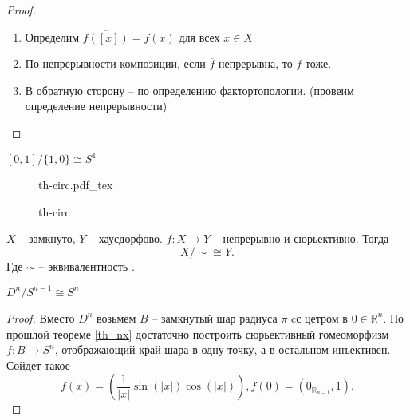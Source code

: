 \documentclass[11pt]{book}
\newcommand{\incfig}[1]{%
    \def\svgwidth{\columnwidth}
    {#1.pdf_tex}
}
\newcommand{\R}{\mathbb{R}}
\theoremstyle{definition}
\theoremstyle{plain}
\theoremstyle{plain}
\theoremstyle{definition}
\theoremstyle{remark}
\begin{document}
\begin{proof}
    \begin{enumerate}
	\item Определим $ \overline{f([x])} = f(x)$ для всех $ x \in X$
	    \item По непрерывности композиции, если $ \overline{f}$ непрерывна, то $ f$ тоже.
	    \item В обратную сторону -- по определению фактортопологии. (провеим определение непрерывности)
    \end{enumerate}
\end{proof}
\begin{thm}
    $ [0, 1] / \{1, 0\} \cong S^{1}$
\begin{figure}[ht]
    \centering
    \incfig{th-circ}
    \caption{th-circ}
    \label{fig:th-circ}
\end{figure}
\end{thm}
\begin{thm}\label{th_nx}
    $ X$ -- замкнуто, $ Y$ -- хаусдорфово.
    $ f : X \to  Y $ -- непрерывно и сюрьективно.
    Тогда \[
    X /\sim  \cong  Y 
    .\] 
    Где $ \sim $ -- эквивалентность .%
\end{thm}
\begin{thm}
    $ D^{n} / S^{n-1} \cong S^{n}$
\end{thm}
\begin{proof}
    Вместо $ D^{n}$ возьмем $ B$ -- замкнутый шар радиуса $ \pi$ cс цетром в $ 0 \in \R^{n} $.
    По прошлой теореме \ref{th_nx} достаточно построить сюрьективный гомеоморфизм $ f: B \to  S ^{n}$, отображающий край шара в одну точку, а в остальном инъективен.
    Сойдет такое 
    \[
	f(x) = \left( \frac{1}{|x|} \sin(|x|) \cos (|x|) \right) , f(0) = (0_{\R_{n-1}}, 1)
    .\] 
\end{proof}
\end{document}
